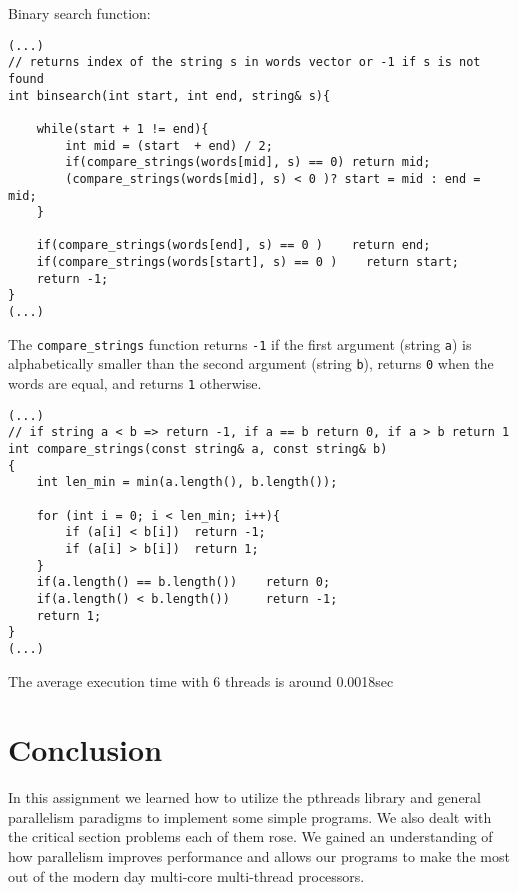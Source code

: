 \documentclass[a4paper,11pt]{article}
\begin{document}
Binary search function:

\begin{verbatim}
(...)
// returns index of the string s in words vector or -1 if s is not found
int binsearch(int start, int end, string& s){

    while(start + 1 != end){
        int mid = (start  + end) / 2;
        if(compare_strings(words[mid], s) == 0) return mid;
        (compare_strings(words[mid], s) < 0 )? start = mid : end = mid; 
    }

    if(compare_strings(words[end], s) == 0 )    return end;
    if(compare_strings(words[start], s) == 0 )    return start;
    return -1;
}
(...)
\end{verbatim}

The \texttt{compare\_strings} function returns \texttt{-1} if the first argument (string \texttt{a}) is alphabetically smaller than the second argument (string \texttt{b}), returns \texttt{0} when the words are equal, and returns \texttt{1} otherwise.

\begin{verbatim}
(...)
// if string a < b => return -1, if a == b return 0, if a > b return 1
int compare_strings(const string& a, const string& b)
{
    int len_min = min(a.length(), b.length());

    for (int i = 0; i < len_min; i++){
        if (a[i] < b[i])  return -1;
        if (a[i] > b[i])  return 1;
    }
    if(a.length() == b.length())    return 0;
    if(a.length() < b.length())     return -1;
    return 1;
}
(...)
\end{verbatim}
The average execution time with 6 threads is around 0.0018sec
\section*{Conclusion}

In this assignment we learned how to utilize the pthreads library and general parallelism paradigms to implement some simple programs. We also dealt with the critical section problems each of them rose. We gained an understanding of how parallelism improves performance and allows our programs to make the most out of the modern day multi-core multi-thread processors.
\end{document}
